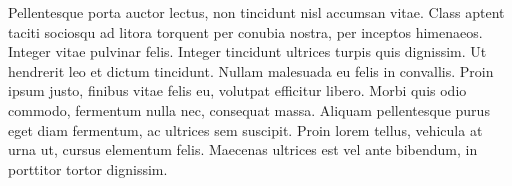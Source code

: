 \documentclass[12pt]{article}
\begin{document}
Pellentesque porta auctor lectus, non tincidunt nisl accumsan vitae. Class aptent taciti sociosqu ad litora torquent per conubia nostra, per inceptos himenaeos. Integer vitae pulvinar felis. Integer tincidunt ultrices turpis quis dignissim. Ut hendrerit leo et dictum tincidunt. Nullam malesuada eu felis in convallis. Proin ipsum justo, finibus vitae felis eu, volutpat efficitur libero. Morbi quis odio commodo, fermentum nulla nec, consequat massa. Aliquam pellentesque purus eget diam fermentum, ac ultrices sem suscipit. Proin lorem tellus, vehicula at urna ut, cursus elementum felis. Maecenas ultrices est vel ante bibendum, in porttitor tortor dignissim.
\end{document}
